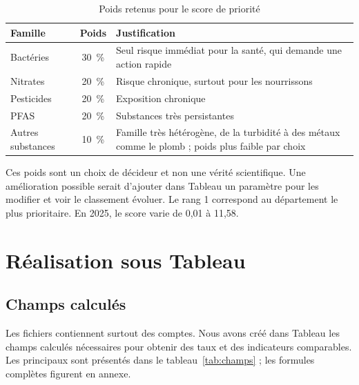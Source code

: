 \documentclass[11pt,a4paper]{article}
\begin{document}
\begin{table}[H]
\centering
\small
\begin{tabular}{l c >{\raggedright\arraybackslash}p{8.5cm}}
\toprule
Famille & Poids & Justification \\
\midrule
Bactéries & 30~\% & Seul risque immédiat pour la santé, qui demande une action rapide \\
Nitrates & 20~\% & Risque chronique, surtout pour les nourrissons \\
Pesticides & 20~\% & Exposition chronique \\
PFAS & 20~\% & Substances très persistantes \\
Autres substances & 10~\% & Famille très hétérogène, de la turbidité à des métaux comme le plomb ; poids plus faible par choix \\
\bottomrule
\end{tabular}
\caption{Poids retenus pour le score de priorité}
\label{tab:poids}
\end{table}

Ces poids sont un choix de décideur et non une vérité scientifique. Une amélioration possible serait d'ajouter dans Tableau un paramètre pour les modifier et voir le classement évoluer. Le rang 1 correspond au département le plus prioritaire. En 2025, le score varie de 0,01 à 11,58.

\section{Réalisation sous Tableau}

\subsection{Champs calculés}

Les fichiers contiennent surtout des comptes. Nous avons créé dans Tableau les champs calculés nécessaires pour obtenir des taux et des indicateurs comparables. Les principaux sont présentés dans le tableau~\ref{tab:champs} ; les formules complètes figurent en annexe.
\end{document}
